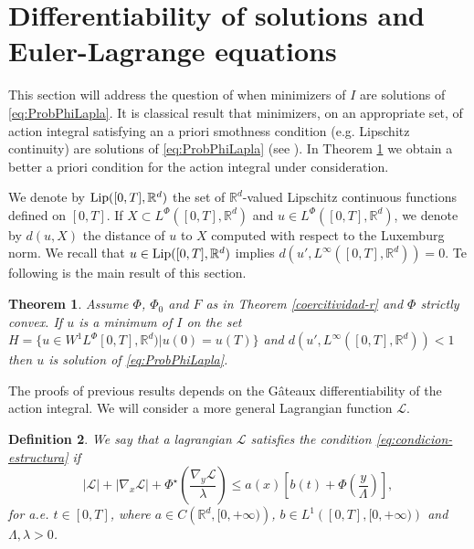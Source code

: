 \documentclass[twoside]{article}
\newtheorem{thm}{Theorem}[section]
\newtheorem{defi}[thm]{Definition}
\theoremstyle{remark}
\newcommand{\lphi}{L^{\Phi}}
\newcommand{\wphi}{W^{1}\lphi}
\newcommand{\rr}{\mathbb{R}}
\renewcommand{\leq}{\leqslant}
\newcommand{\lip}{\mathop{\rm Lip}}
\begin{document}
\section{Differentiability of solutions and Euler-Lagrange equations}\label{sec:diferenciabilidad}


This section will address the question of when minimizers of $I$ are solutions of \eqref{eq:ProbPhiLapla}. It is classical result that minimizers, on an appropriate set, of action integral satisfying an a priori smothness condition (e.g. Lipschitz continuity) are solutions of \eqref{eq:ProbPhiLapla} (see \cite{buttazzo1998one}).  In Theorem \ref{th:tor_prin} we obtain a better a priori condition for the action integral under consideration.

We denote by $\lip([0,T],\rr^d)$ the set of $\rr^d$-valued Lipschitz continuous functions defined on $[0,T]$. If $X\subset \lphi([0,T],\rr^d)$ and $u\in \lphi([0,T],\rr^d)$,  we denote by $d(u,X)$ the distance of $u$ to $X$ computed with respect  to the Luxemburg norm. We recall that  $u\in\lip([0,T],\rr^d)$ implies  $d(u',L^{\infty}([0,T],\rr^d))=0$. Te following is the main result of this section.




\begin{thm}\label{th:tor_prin} Assume $\Phi$, $\Phi_0$ and $F$ as in Theorem \ref{coercitividad-r} and $\Phi$  strictly convex. If $u$ is a minimum of $I$ on the set $H=\{u\in\wphi[0,T],\rr^d)| u(0)=u(T)\}$ and $d(u',L^{\infty}([0,T],\rr^d))<1$ then $u$ is solution of \eqref{eq:ProbPhiLapla}. 
\end{thm}


The proofs of previous results depends on the G\^ateaux differentiability of the action integral. We will consider a more general Lagrangian function $\mathcal{L}$.




\begin{defi} We say that a lagrangian $\mathcal{L}$ satisfies the condition \eqref{eq:condicion-estructura} if
\begin{equation}\label{eq:condicion-estructura}
  |\mathcal{L}|+ |\nabla_{x}\mathcal{L}|+\Phi^{\star}\left(\frac{\nabla_{y}\mathcal{L}}{\lambda}\right)
\leq
a(x)\left[b(t)+ \Phi\left(\frac{y}{\Lambda}\right)\right], \tag{$S$}
\end{equation}
for a.e. $t\in [0,T]$,
where  $a\in C\left(\mathbb{R}^d,[0,+\infty)\right)$, $b\in L^1\left([0,T],[0,+\infty)\right) $ and $\Lambda,\lambda>0$.
\end{defi}
\end{document}
